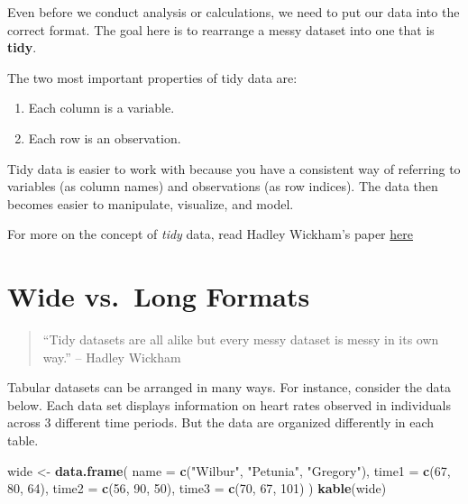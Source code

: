 \documentclass[]{book}
\newenvironment{Shaded}{\begin{snugshade}}{\end{snugshade}}
\newcommand{\KeywordTok}[1]{\textcolor[rgb]{0.13,0.29,0.53}{\textbf{#1}}}
\newcommand{\DataTypeTok}[1]{\textcolor[rgb]{0.13,0.29,0.53}{#1}}
\newcommand{\DecValTok}[1]{\textcolor[rgb]{0.00,0.00,0.81}{#1}}
\newcommand{\StringTok}[1]{\textcolor[rgb]{0.31,0.60,0.02}{#1}}
\newcommand{\NormalTok}[1]{#1}
\providecommand{\tightlist}{%
  \setlength{\itemsep}{0pt}\setlength{\parskip}{0pt}}
\begin{document}
Even before we conduct analysis or calculations, we need to put our data
into the correct format. The goal here is to rearrange a messy dataset
into one that is \textbf{tidy}.

The two most important properties of tidy data are:

\begin{enumerate}
\def\labelenumi{\arabic{enumi})}
\tightlist
\item
  Each column is a variable.
\item
  Each row is an observation.
\end{enumerate}

Tidy data is easier to work with because you have a consistent way of
referring to variables (as column names) and observations (as row
indices). The data then becomes easier to manipulate, visualize, and
model.

For more on the concept of \emph{tidy} data, read Hadley Wickham's paper
\href{http://vita.had.co.nz/papers/tidy-data.html}{here}

\section{Wide vs.~Long Formats}\label{wide-vs.long-formats}

\begin{quote}
``Tidy datasets are all alike but every messy dataset is messy in its
own way.'' -- Hadley Wickham
\end{quote}

Tabular datasets can be arranged in many ways. For instance, consider
the data below. Each data set displays information on heart rates
observed in individuals across 3 different time periods. But the data
are organized differently in each table.

\begin{Shaded}
\begin{Highlighting}[]
\NormalTok{wide <-}\StringTok{ }\KeywordTok{data.frame}\NormalTok{(}
  \DataTypeTok{name =} \KeywordTok{c}\NormalTok{(}\StringTok{"Wilbur"}\NormalTok{, }\StringTok{"Petunia"}\NormalTok{, }\StringTok{"Gregory"}\NormalTok{),}
  \DataTypeTok{time1 =} \KeywordTok{c}\NormalTok{(}\DecValTok{67}\NormalTok{, }\DecValTok{80}\NormalTok{, }\DecValTok{64}\NormalTok{),}
  \DataTypeTok{time2 =} \KeywordTok{c}\NormalTok{(}\DecValTok{56}\NormalTok{, }\DecValTok{90}\NormalTok{, }\DecValTok{50}\NormalTok{),}
  \DataTypeTok{time3 =} \KeywordTok{c}\NormalTok{(}\DecValTok{70}\NormalTok{, }\DecValTok{67}\NormalTok{, }\DecValTok{101}\NormalTok{)}
\NormalTok{)}
\KeywordTok{kable}\NormalTok{(wide)}
\end{Highlighting}
\end{Shaded}
\end{document}
